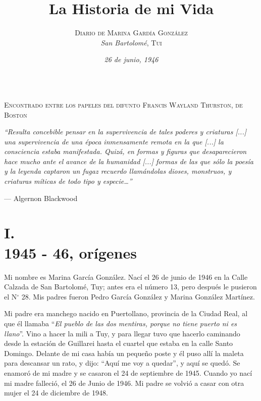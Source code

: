 \documentclass[12pt,a5paper]{book}
\title{\textbf{ \Huge La Historia de mi Vida}}
\author{\textsc{Diario de Marina Gardía González}\\ {\footnotesize \textit{San Bartolomé}, \textsc{Tui}}}
\date{\textit{26 de junio, 1946}}
\begin{document}
\maketitle


\[\]
\pagebreak

\begin{center}
\textsc{Encontrado entre los papeles del difunto Francis Wayland Thurston, de Boston}  
\end{center}

\textit{``Resulta concebible pensar en la supervivencia de tales poderes y criaturas [...] una supervivencia de una época inmensamente remota en la que [...] la consciencia estaba manifestada. Quizá, en formas y figuras que desaparecieron hace mucho ante el avance de la humanidad [...] formas de las que sólo la poesía y la leyenda captaron un fugaz recuerdo llamándolas dioses, monstruos, y criaturas míticas de todo tipo y especie…''}
\begin{flushright}
--- Algernon Blackwood
\end{flushright}









\section*{I.\\1945 - 46, orígenes}

Mi nombre es Marina García González. Nací el 26 de junio de 1946 en la Calle Calzada de San Bartolomé, Tuy; antes era el número 13, pero después le pusieron el N$^\circ$ 28. Mis padres fueron Pedro García González y Marina González Martínez. 

Mi padre era manchego nacido en Puertollano, provincia de la Ciudad Real, al que él llamaba ``\textit{El pueblo de las dos mentiras, porque no tiene puerto ni es llano}''. Vino a hacer la mili a Tuy, y para llegar tuvo que hacerlo caminando desde la estación de Guillarei hasta el cuartel que estaba en la calle Santo Domingo. Delante de mi casa había un pequeño poste y él puso allí la maleta para descansar un rato, y dijo: “Aquí me voy a  quedar”, y aquí se quedó. Se enamoró de mi madre y se casaron el 24 de septiembre de 1945. Cuando yo nací mi madre falleció, el 26 de Junio de 1946. Mi padre se volvió a casar con otra mujer el 24 de diciembre de 1948.
\end{document}

